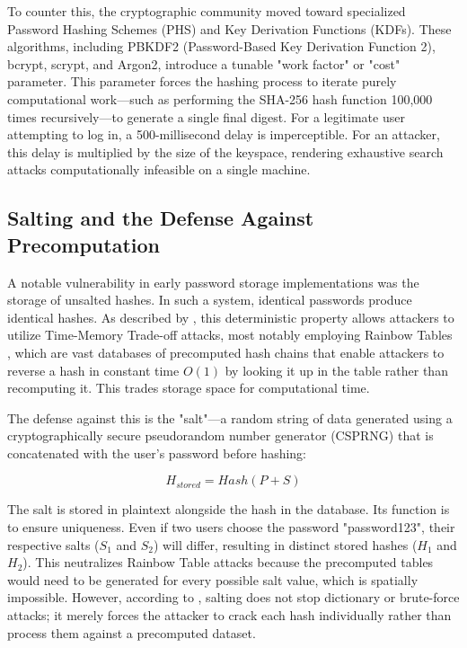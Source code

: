 To counter this, the cryptographic community moved toward specialized Password Hashing Schemes (PHS) and Key Derivation Functions (KDFs). These algorithms, including PBKDF2 (Password-Based Key Derivation Function 2), bcrypt, scrypt, and Argon2, introduce a tunable "work factor" or "cost" parameter. This parameter forces the hashing process to iterate purely computational work—such as performing the SHA-256 hash function 100,000 times recursively—to generate a single final digest. For a legitimate user attempting to log in, a 500-millisecond delay is imperceptible. For an attacker, this delay is multiplied by the size of the keyspace, rendering exhaustive search attacks computationally infeasible on a single machine.

\subsection{Salting and the Defense Against Precomputation}

A notable vulnerability in early password storage implementations was the storage of unsalted hashes. In such a system, identical passwords produce identical hashes. As described by \cite{what_is_password_hashing}, this deterministic property allows attackers to utilize Time-Memory Trade-off attacks, most notably employing Rainbow Tables \cite{enwiki:1333530676}, which are vast databases of precomputed hash chains that enable attackers to reverse a hash in constant time $O(1)$ by looking it up in the table rather than recomputing it. This trades storage space for computational time.

The defense against this is the "salt"—a random string of data generated using a cryptographically secure pseudorandom number generator (CSPRNG) that is concatenated with the user's password before hashing:

\begin{equation}
H_{stored}=Hash(P+S)
\end{equation}

The salt is stored in plaintext alongside the hash in the database. Its function is to ensure uniqueness. Even if two users choose the password "password123", their respective salts ($S_1$ and $S_2$) will differ, resulting in distinct stored hashes ($H_1$ and $H_2$). This neutralizes Rainbow Table attacks because the precomputed tables would need to be generated for every possible salt value, which is spatially impossible. However, according to \cite{complete_guide_passwd_hash}, salting does not stop dictionary or brute-force attacks; it merely forces the attacker to crack each hash individually rather than process them against a precomputed dataset.

